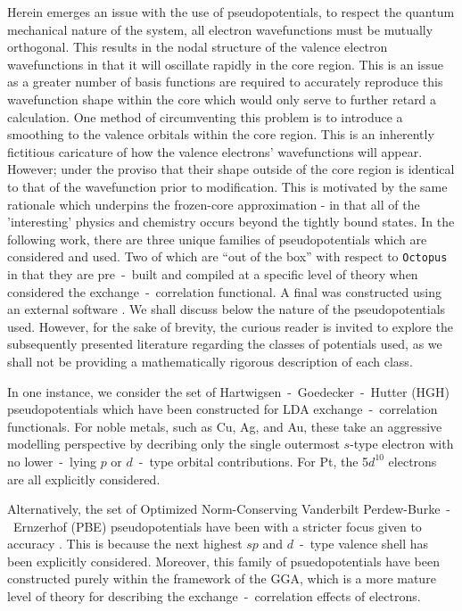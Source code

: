 Herein emerges an issue with the use of pseudopotentials, to respect the quantum mechanical nature of the system, all electron wavefunctions must be mutually orthogonal. This results in the nodal structure of the valence electron wavefunctions in that it will oscillate rapidly in the core region. This is an issue as a greater number of basis functions are required to accurately reproduce this wavefunction shape within the core which would only serve to further retard a calculation. One method of circumventing this problem is to introduce a smoothing to the valence orbitals within the core region. This is an inherently fictitious caricature of how the valence electrons' wavefunctions will appear. However; under the proviso that their shape outside of the core region is identical to that of the wavefunction prior to modification. This is motivated by the same rationale which underpins the frozen-core approximation - in that all of the 'interesting' physics and chemistry occurs beyond the tightly bound states. In the following work, there are three unique families of pseudopotentials which are considered and used. Two of which are ``out of the box'' with respect to \texttt{Octopus} in that they are pre~-~built and compiled at a specific level of theory when considered the exchange~-~correlation functional. A final was constructed using an external software \cite{FHI}. We shall discuss below the nature of the pseudopotentials used. However, for the sake of brevity, the curious reader is invited to explore the subsequently presented literature regarding the classes of potentials used, as we shall not be providing a mathematically rigorous description of each class.

In one instance, we consider the set of Hartwigsen~-~Goedecker~-~Hutter (HGH) pseudopotentials \cite{PhysRevB.58.3641} which have been constructed for LDA exchange~-~correlation functionals. For noble metals, such as Cu, Ag, and Au, these take an aggressive modelling perspective by decribing only the single outermost $s$-type electron with no lower~-~lying $p$ or $d$~-~type orbital contributions. For Pt, the 5$d^{10}$ electrons are all explicitly considered.

Alternatively, the set of Optimized Norm-Conserving Vanderbilt Perdew-Burke~-~Ernzerhof (PBE) \cite{GGA_Simple} pseudopotentials have been with a stricter focus given to accuracy \cite{SCHLIPF201536}. This is because the next highest $sp$ and $d$~-~type valence shell has been explicitly considered. Moreover, this family of psuedopotentials have been constructed purely within the framework of the GGA, which is a more mature level of theory for describing the exchange~-~correlation effects of electrons.

